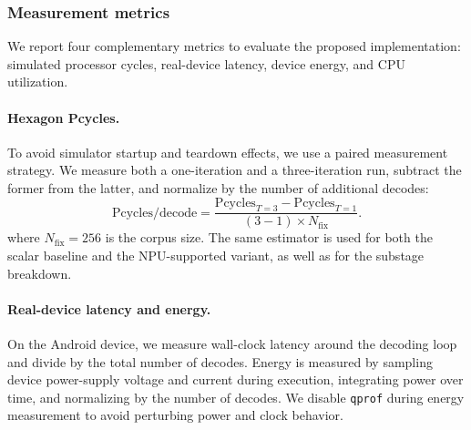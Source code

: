 
\subsubsection{Measurement metrics}
We report four complementary metrics to evaluate the proposed implementation:
simulated processor cycles, real-device latency, device energy, and CPU
utilization.

\paragraph{Hexagon Pcycles.}
To avoid simulator startup and teardown effects, we use a paired measurement
strategy. We measure both a one-iteration and a three-iteration run, subtract the
former from the latter, and normalize by the number of additional decodes:
\[
    \mathrm{Pcycles/decode}
    =
    \frac{
        \mathrm{Pcycles}_{T=3}
        -
        \mathrm{Pcycles}_{T=1}
    }{
        (3-1) \times N_{\mathrm{fix}}
    } .
\]
where $N_{\mathrm{fix}} = 256$ is the corpus size. The same estimator is used for both the scalar baseline and the NPU-supported
variant, as well as for the substage breakdown.

\paragraph{Real-device latency and energy.}
On the Android device, we measure wall-clock latency around the decoding loop
and divide by the total number of decodes. Energy is measured by sampling device
power-supply voltage and current during execution, integrating power over time,
and normalizing by the number of decodes. We disable \texttt{qprof} during
energy measurement to avoid perturbing power and clock behavior.

